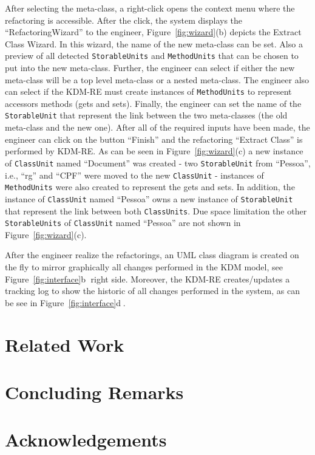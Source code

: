 \documentclass[12pt]{article}
\begin{document}
After selecting the meta-class, a right-click opens the context menu where the refactoring is accessible. After the click, the system displays the ``RefactoringWizard'' to the engineer, Figure~\ref{fig:wizard}(b) depicts the Extract Class Wizard. In this wizard, the name of the new meta-class can be set. Also a preview of all detected \texttt{StorableUnits} and \texttt{MethodUnits} that can be chosen to put into the new meta-class. Further, the engineer can select if either the new meta-class will be a top level meta-class or a nested meta-class. The engineer also can select if the KDM-RE must create instances of \texttt{MethodUnits} to represent accessors methods (gets and sets). Finally, the engineer can set the name of the \texttt{StorableUnit} that represent the link between the two meta-classes (the old meta-class and the new one). After all of the required inputs have been made, the engineer can click on the button ``Finish'' and the refactoring ``Extract Class'' is performed by KDM-RE. As can be seen in Figure~\ref{fig:wizard}(c) a new instance of \texttt{ClassUnit} named ``Document'' was created - two \texttt{StorableUnit} from ``Pessoa'', i.e., ``rg'' and ``CPF'' were moved to the new \texttt{ClassUnit} - instances of \texttt{MethodUnits} were also created to represent the gets and sets. In addition, the instance of \texttt{ClassUnit} named ``Pessoa'' owns a new instance of \texttt{StorableUnit} that represent the link between both \texttt{ClassUnits}. Due space limitation the other \texttt{StorableUnits} of \texttt{ClassUnit} named ``Pessoa'' are not shown in Figure~\ref{fig:wizard}(c).

After the engineer realize the refactorings, an UML class diagram is created on the fly to mirror graphically all changes performed in the KDM model, see Figure~\ref{fig:interface}\textcircled{b} right side. Moreover, the KDM-RE creates/updates a tracking log to show the historic of all changes performed in the system, as can be see in Figure~\ref{fig:interface}\textcircled{d}.                     


\section{Related Work\label{sec:related}}
 

\section{Concluding Remarks\label{sec:conclusion}}
 

\section{Acknowledgements}~\label{sec:ack}
 



\end{document}
